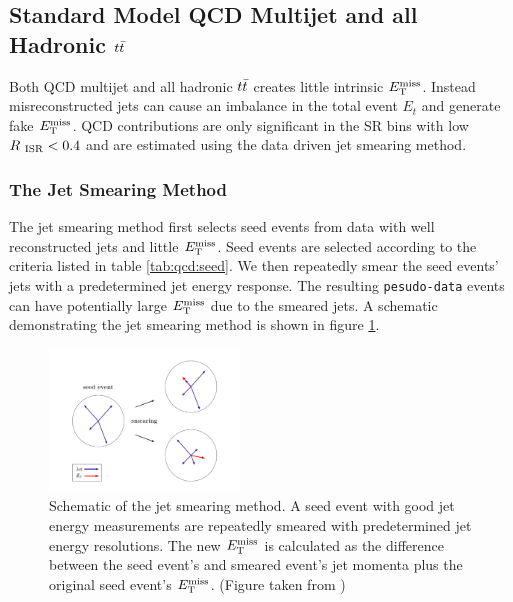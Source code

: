 \subsection{Standard Model QCD Multijet and all Hadronic $t\bar{t}$}
\label{sec:Bkg:QCD}

\indent Both QCD multijet and all hadronic $t\bar{t}$ creates little intrinsic $E_{\mathrm{T}}^{\mathrm{miss}}$. Instead misreconstructed jets can cause an imbalance in the total event $E_t$ and generate fake $E_{\mathrm{T}}^{\mathrm{miss}}$.  QCD contributions are only significant in the SR bins with low $R_{~\mathrm{ISR}} < 0.4$ and are estimated using the data driven jet smearing method.  \\

\subsubsection*{The Jet Smearing Method}

\indent The jet smearing method first selects seed events from data with well reconstructed jets and little $E_{\mathrm{T}}^{\mathrm{miss}}$.  Seed events are selected according to the criteria listed in table \ref{tab:qcd:seed}. We then repeatedly smear the seed events' jets with a predetermined jet energy response.  The resulting {\tt pesudo-data} events can have potentially large $E_{\mathrm{T}}^{\mathrm{miss}}$ due to the smeared jets.  A schematic demonstrating the jet smearing method is shown in figure \ref{fig:jetsmearing}.\\

\begin{figure}[htbp]
\begin{center}
\includegraphics[width=0.45\textwidth]{figures/QCDJetSmearing/jet_smearing.pdf}
\end{center}
\caption{Schematic of the jet smearing method.  A seed event with good jet energy measurements are repeatedly smeared with predetermined jet energy resolutions.  The new $E_{\mathrm{T}}^{\mathrm{miss}}$ is calculated as the difference between the seed event's and smeared event's jet momenta plus the original seed event's $E_{\mathrm{T}}^{\mathrm{miss}}$.  (Figure taken from \cite{JetSmearing})}
\label{fig:jetsmearing}
\end{figure}

